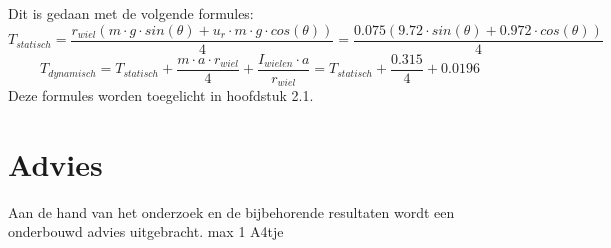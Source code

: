 \documentclass{article}
\begin{document}
        Dit is gedaan met de volgende formules:
        $$T_{statisch} = \frac{r_{wiel}(m \cdot g \cdot sin(\theta) + u_r \cdot m \cdot g \cdot cos(\theta))}{4} = \frac{0.075(9.72 \cdot sin(\theta) +  0.972 \cdot cos(\theta))}{4}$$
        $$T_{dynamisch} = T_{statisch} + \frac{m \cdot a \cdot r_{wiel}}{4} + \frac{I_{wielen} \cdot a}{r_{wiel}} = T_{statisch} + \frac{0.315}{4}+ 0.0196 $$
        Deze formules worden toegelicht in hoofdstuk 2.1.    
        
        
        


\section{Advies}
    Aan de hand van het onderzoek en de
    bijbehorende resultaten wordt een onderbouwd
    advies uitgebracht. max 1 A4tje

\appendix
\end{document}
